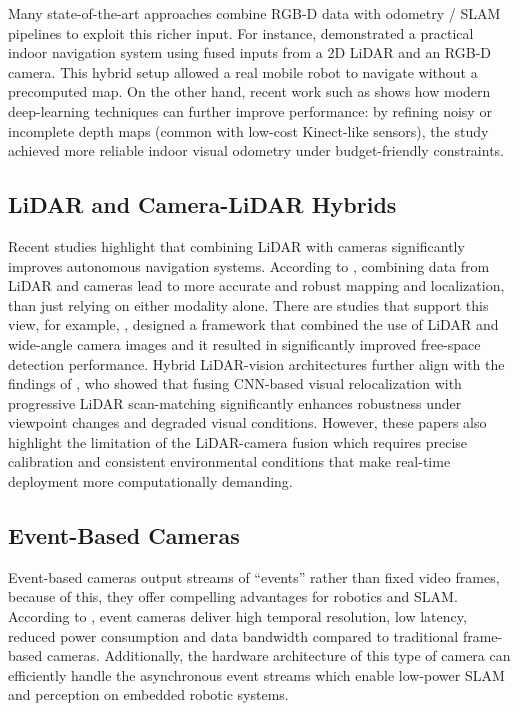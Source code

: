 Many state-of-the-art approaches combine RGB-D data with odometry / SLAM pipelines to exploit this richer input. For instance, \cite{Gatesichapakorn2019ROSLidarRGBD} demonstrated a practical indoor navigation system using fused inputs from a 2D LiDAR and an RGB-D camera. This hybrid setup allowed a real mobile robot to navigate without a precomputed map. On the other hand, recent work such as \cite{Kostusiak2023EnhancingVOWithDepth} shows how modern deep-learning techniques can further improve performance: by refining noisy or incomplete depth maps (common with low-cost Kinect-like sensors), the study achieved more reliable indoor visual odometry under budget-friendly constraints.

\subsection{LiDAR and Camera-LiDAR Hybrids}
Recent studies highlight that combining LiDAR with cameras significantly improves autonomous navigation systems. According to \cite{Kolar2020DataFusionSurvey}, combining data from LiDAR and cameras lead to more accurate and robust mapping and localization, than just relying on either modality alone. There are studies that support this view, for example, \cite{DeSilva2018LidarWideAngleFusion}, designed a framework that  combined the use of LiDAR and wide-angle camera images and it resulted in significantly improved free-space detection performance. Hybrid LiDAR-vision architectures further align with the findings of \cite{Liu2022RobustLocalizationVisionCNN}, who showed that fusing CNN-based visual relocalization with progressive LiDAR scan-matching significantly enhances robustness under viewpoint changes and degraded visual conditions. However, these papers also highlight the limitation of the LiDAR-camera fusion which requires precise calibration and consistent environmental conditions that make real-time deployment more computationally demanding.

\subsection{Event-Based Cameras}
Event-based cameras output streams of “events” rather than fixed video frames, because of this, they offer compelling advantages for robotics and SLAM. According to \cite{Tenzin2024EventCamerasVSLAMSurvey}, event cameras deliver high temporal resolution, low latency, reduced power consumption and data bandwidth compared to traditional frame-based cameras. Additionally, the hardware architecture of this type of camera can efficiently handle the asynchronous event streams which enable low-power SLAM and perception on embedded robotic systems.

